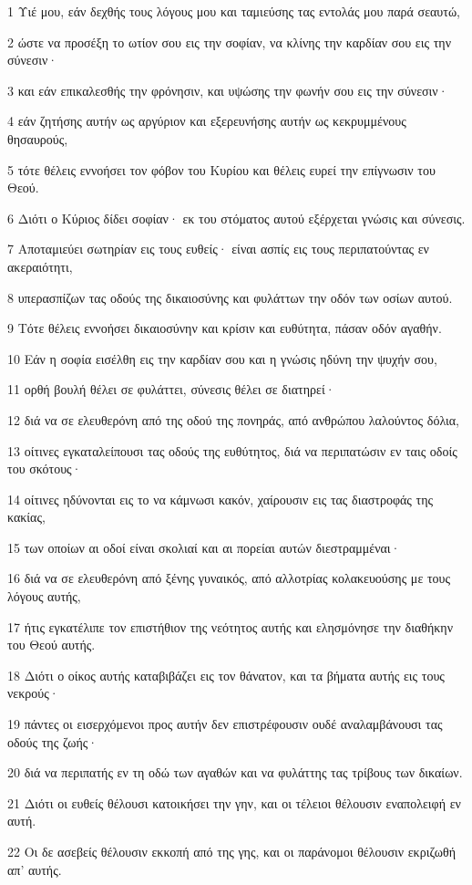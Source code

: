 \par 1 Υιέ μου, εάν δεχθής τους λόγους μου και ταμιεύσης τας εντολάς μου παρά σεαυτώ,
\par 2 ώστε να προσέξη το ωτίον σου εις την σοφίαν, να κλίνης την καρδίαν σου εις την σύνεσιν·
\par 3 και εάν επικαλεσθής την φρόνησιν, και υψώσης την φωνήν σου εις την σύνεσιν·
\par 4 εάν ζητήσης αυτήν ως αργύριον και εξερευνήσης αυτήν ως κεκρυμμένους θησαυρούς,
\par 5 τότε θέλεις εννοήσει τον φόβον του Κυρίου και θέλεις ευρεί την επίγνωσιν του Θεού.
\par 6 Διότι ο Κύριος δίδει σοφίαν· εκ του στόματος αυτού εξέρχεται γνώσις και σύνεσις.
\par 7 Αποταμιεύει σωτηρίαν εις τους ευθείς· είναι ασπίς εις τους περιπατούντας εν ακεραιότητι,
\par 8 υπερασπίζων τας οδούς της δικαιοσύνης και φυλάττων την οδόν των οσίων αυτού.
\par 9 Τότε θέλεις εννοήσει δικαιοσύνην και κρίσιν και ευθύτητα, πάσαν οδόν αγαθήν.
\par 10 Εάν η σοφία εισέλθη εις την καρδίαν σου και η γνώσις ηδύνη την ψυχήν σου,
\par 11 ορθή βουλή θέλει σε φυλάττει, σύνεσις θέλει σε διατηρεί·
\par 12 διά να σε ελευθερόνη από της οδού της πονηράς, από ανθρώπου λαλούντος δόλια,
\par 13 οίτινες εγκαταλείπουσι τας οδούς της ευθύτητος, διά να περιπατώσιν εν ταις οδοίς του σκότους·
\par 14 οίτινες ηδύνονται εις το να κάμνωσι κακόν, χαίρουσιν εις τας διαστροφάς της κακίας,
\par 15 των οποίων αι οδοί είναι σκολιαί και αι πορείαι αυτών διεστραμμέναι·
\par 16 διά να σε ελευθερόνη από ξένης γυναικός, από αλλοτρίας κολακευούσης με τους λόγους αυτής,
\par 17 ήτις εγκατέλιπε τον επιστήθιον της νεότητος αυτής και ελησμόνησε την διαθήκην του Θεού αυτής.
\par 18 Διότι ο οίκος αυτής καταβιβάζει εις τον θάνατον, και τα βήματα αυτής εις τους νεκρούς·
\par 19 πάντες οι εισερχόμενοι προς αυτήν δεν επιστρέφουσιν ουδέ αναλαμβάνουσι τας οδούς της ζωής·
\par 20 διά να περιπατής εν τη οδώ των αγαθών και να φυλάττης τας τρίβους των δικαίων.
\par 21 Διότι οι ευθείς θέλουσι κατοικήσει την γην, και οι τέλειοι θέλουσιν εναπολειφή εν αυτή.
\par 22 Οι δε ασεβείς θέλουσιν εκκοπή από της γης, και οι παράνομοι θέλουσιν εκριζωθή απ' αυτής.

